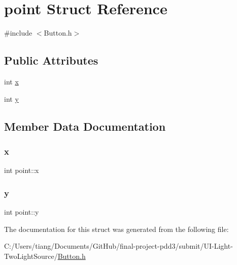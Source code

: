 \hypertarget{structpoint}{}\section{point Struct Reference}
\label{structpoint}


{\ttfamily \#include $<$Button.\+h$>$}

\subsection*{Public Attributes}
\begin{DoxyCompactItemize}
\item 
int \mbox{\hyperlink{structpoint_ad679b07fb69d55f5ad454d0f1f2891d5}{x}}
\item 
int \mbox{\hyperlink{structpoint_a9a82ca9504acabb1e30569f89c805471}{y}}
\end{DoxyCompactItemize}


\subsection{Member Data Documentation}
\mbox{\label{structpoint_ad679b07fb69d55f5ad454d0f1f2891d5}} 
\subsubsection{\texorpdfstring{x}{x}}
{\footnotesize\ttfamily int point\+::x}

\mbox{\label{structpoint_a9a82ca9504acabb1e30569f89c805471}} 
\subsubsection{\texorpdfstring{y}{y}}
{\footnotesize\ttfamily int point\+::y}



The documentation for this struct was generated from the following file\+:\begin{DoxyCompactItemize}
\item 
C\+:/\+Users/tiang/\+Documents/\+Git\+Hub/final-\/project-\/pdd3/submit/\+U\+I-\/\+Light-\/\+Two\+Light\+Source/\mbox{\hyperlink{_button_8h}{Button.\+h}}\end{DoxyCompactItemize}
